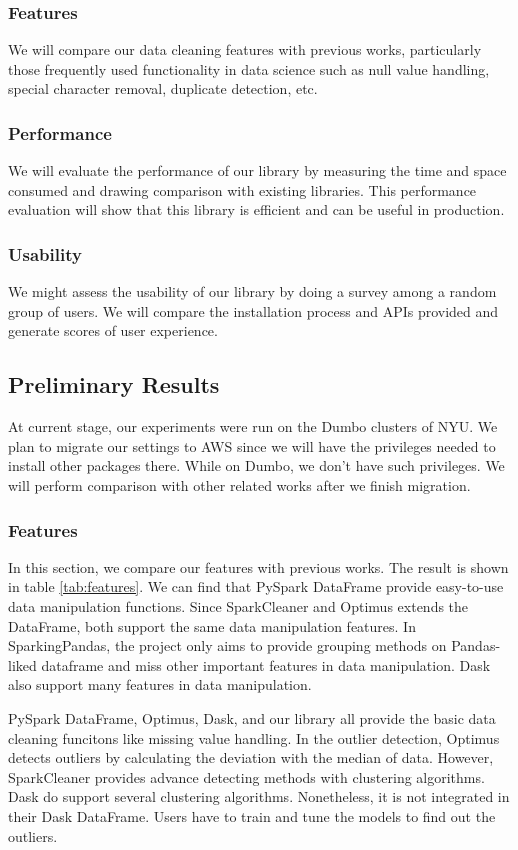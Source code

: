 \documentclass[sigconf]{acmart}
\begin{document}
\subsubsection{Features}
We will compare our data cleaning features with previous works, particularly those frequently used functionality in data science such as null value handling, special character removal, duplicate detection, etc. 
\subsubsection{Performance}
We will evaluate the performance of our library by measuring the time and space consumed and drawing comparison with existing libraries. This performance evaluation will show that this library is efficient and can be useful in production. 
\subsubsection{Usability}
We might assess the usability of our library by doing a survey among a random group of users. We will compare the installation process and APIs provided and generate scores of user experience.

\subsection{Preliminary Results}
At current stage, our experiments were run on the Dumbo clusters of NYU. We plan to migrate our settings to AWS since we will have the privileges needed to install other packages there. While on Dumbo, we don't have such privileges. We will perform comparison with other related works after we finish migration.

\subsubsection{Features}
In this section, we compare our features with previous works. The result is shown in table \ref{tab:features}. We can find that PySpark DataFrame provide easy-to-use data manipulation functions. Since SparkCleaner and Optimus extends the DataFrame, both support the same data manipulation features. In SparkingPandas, the project only aims to provide grouping methods on Pandas-liked dataframe and miss other important features in data manipulation. Dask also support many features in data manipulation. 

PySpark DataFrame, Optimus, Dask, and our library all provide the basic data cleaning funcitons like missing value handling. In the outlier detection, Optimus detects outliers by calculating the deviation with the median of data. However, SparkCleaner provides advance detecting methods with clustering algorithms. Dask do support several clustering algorithms. Nonetheless, it is not integrated in their Dask DataFrame. Users have to train and tune the models to find out the outliers.
\end{document}
